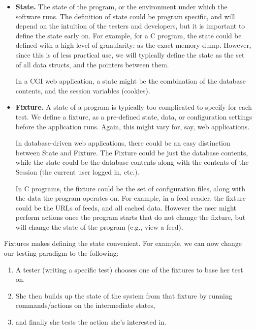 \documentclass{article}
\begin{document}
\begin{itemize}
\item {\bf State.} The state of the program, or the environment under
  which the software runs. The definition of state could be program
  specific, and will depend on the intuition of the testers and
  developers, but it is important to define the state early
  on. For example, for a C program, the state could be defined with a
  high level of granularity: as the exact memory dump. However, since
  this is of less practical use, we will typically define the state as
  the set of all data structs, and the pointers between them. 
  
  In a CGI web application, a state might be the combination of the
  database contents, and the session variables (cookies).
\item {\bf Fixture.} A state of a program is typically too complicated
  to specify for each test. We define a fixture, as a pre-defined
  state, data, or configuration settings before the application
  runs. Again, this might vary for, say, web applications.

  In database-driven web applications, there could be an easy
  distinction between State and Fixture. The Fixture could be just the
  database contents, while the state could be the database contents
  along with the contents of the Session (the current user logged in,
  etc.).

  In C programs, the fixture could be the set of configuration files,
  along with the data the program operates on. For example, in a feed
  reader, the fixture could be the URLs of feeds, and all cached
  data. However the user might perform actions once the program starts
  that do not change the fixture, but will change the state of the
  program (e.g., view a feed).

\end{itemize}

  Fixtures makes defining the state convenient. For example, we can
  now change our testing paradigm to the following:

\begin{enumerate}
\item A tester (writing a specific test) chooses one of the fixtures to
  base her test on. 
\item She then builds up the state of the system from that fixture by
  running commands/actions on the intermediate states,
\item and finally she tests the action she's interested in.
\end{enumerate}
\end{document}
